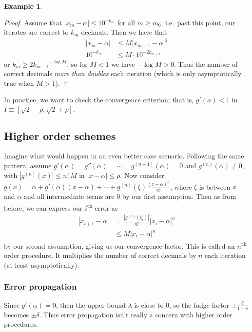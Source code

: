 \documentclass[12pt,letterpaper,DIV=11]{scrartcl}
\theoremstyle{plain}
\theoremstyle{definition}
\newtheorem{example}{Example}[section]
\theoremstyle{remark}
\begin{document}
\begin{example}
  \begin{proof}
    Assume that $|x_m - \alpha| \leq 10^{-k_m}$ for all $m \geq m_0$; i.e.\ past this point, our iterates are correct to $k_m$ decimals.
    Then we have that \begin{align*}
      |x_m - \alpha| &\leq M {\left\vert x_{m - 1} - \alpha \right\vert}^2 \\
      10^{-k_m} &\leq M \cdot 10^{-2k_{m - 1}}
    \end{align*} or $k_m \geq {2 k_{m - 1}}^{-\log M}$,
    so for $M < 1$ we have $-\log M > 0$.
    Thus the number of correct decimals \emph{more than doubles} each iteration (which is only asymptotically true when $M > 1$).
  \end{proof}

  In practice, we want to check the convergence criterion; that is, $g'(x) < 1$ in $I \equiv [\sqrt{2} - \rho, \sqrt{2} + \rho]$.
\end{example}

\subsection{Higher order schemes}
Imagine what would happen in an even better case scenario.
Following the same pattern, assume $g'(\alpha) = g''(\alpha) = \cdots = g^{(n - 1)}(\alpha) = 0$ and $g^{(n)}(\alpha) \neq 0$, with $|g^{(n)}(x)| \leq n!\, M$
in $|x - \alpha| \leq \rho$.
Now consider $g(x) = \alpha + g'(\alpha)(x - \alpha) + \cdots + g^{(n)}(\xi) \frac{{(x - \alpha)}^n}{n!}$, where $\xi$ is between $x$ and $\alpha$ and all intermediate terms are 0 by our first assumption.
Then as from before, we can express our $i$\textsuperscript{th} error as \begin{align*}
  |x_{i + 1} - \alpha| &= \frac{\left\lvert g^{(n)}(\xi_i) \right\rvert}{n!} {\left\lvert x_i - \alpha \right\rvert}^n \\
                       &\leq M {|x_i - \alpha|}^n
\end{align*} by our second assumption, giving us our convergence factor.
This is called an $n$\textsuperscript{th} order procedure.
It multiplies the number of correct decimals by $n$ each iteration (at least asymptotically).

\subsubsection{Error propagation}
Since $g'(\alpha) = 0$, then the upper bound $\lambda$ is close to 0, so the fudge factor $\pm \frac{\delta}{1 - \delta}$ becomes $\pm \delta$.
Thus error propagation isn't really a concern with higher order procedures.
\end{document}
